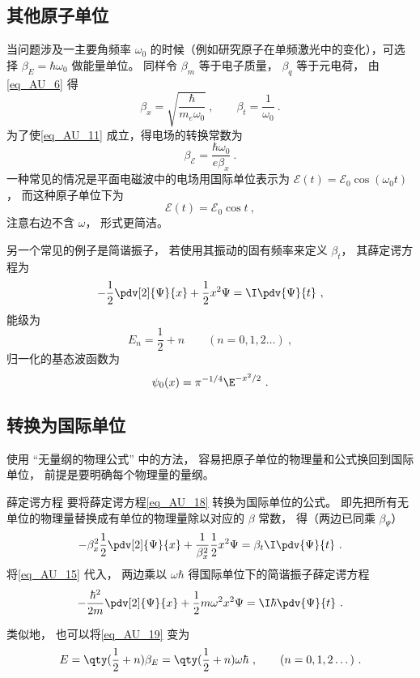 \subsection{其他原子单位}

当问题涉及一主要角频率 $\omega_0$ 的时候（例如研究原子在单频激光中的变化），可选择 $\beta_E = \hbar\omega_0$ 做能量单位。 同样令 $\beta_m$ 等于电子质量， $\beta_q$ 等于元电荷， 由\autoref{eq_AU_6} 得
\begin{equation}\label{eq_AU_15}
\beta_x = \sqrt{\frac{\hbar}{m_e\omega_0}}~,
\qquad
\beta_t = \frac{1}{\omega_0}~.
\end{equation}
为了使\autoref{eq_AU_11} 成立，得电场的转换常数为
\begin{equation}
\beta_\mathcal{E} = \frac{\hbar\omega_0}{e \beta_x}~.
\end{equation}
一种常见的情况是平面电磁波中的电场用国际单位表示为 $\mathcal{E}(t) = \mathcal{E}_0\cos(\omega_0 t)$， 而这种原子单位下为
\begin{equation}
\mathcal{E}(t) = \mathcal{E}_0\cos t~,
\end{equation}
注意右边不含 $\omega$， 形式更简洁。

另一个常见的例子是简谐振子， 若使用其振动的固有频率来定义 $\beta_t$， 其薛定谔方程为
\begin{equation}\label{eq_AU_18}
-\frac12 \pdv[2]{\Psi}{x} + \frac12 x^2 \Psi= \I\pdv{\Psi}{t}~,
\end{equation}
能级为
\begin{equation}\label{eq_AU_19}
E_n = \frac12 + n \qquad (n = 0, 1, 2\dots)~,
\end{equation}
归一化的基态波函数为
\begin{equation}
\psi_0(x) = \pi^{-1/4} \E^{-x^2/2}~.
\end{equation}

\subsection{转换为国际单位}
使用 “无量纲的物理公式” 中的方法， 容易把原子单位的物理量和公式换回到国际单位， 前提是要明确每个物理量的量纲。

\begin{example}{薛定谔方程}
要将薛定谔方程\autoref{eq_AU_18} 转换为国际单位的公式。 即先把所有无单位的物理量替换成有单位的物理量除以对应的 $\beta$ 常数， 得（两边已同乘 $\beta_\Psi$）
\begin{equation}
-\beta_x^2\frac12 \pdv[2]{\Psi}{x} + \frac{1}{\beta_x^2}\frac12 x^2 \Psi= \beta_t\I\pdv{\Psi}{t}~.
\end{equation}
将\autoref{eq_AU_15} 代入， 两边乘以 $\omega\hbar$ 得国际单位下的简谐振子薛定谔方程
\begin{equation}
-\frac{\hbar^2}{2m} \pdv[2]{\Psi}{x} + \frac12 m\omega^2 x^2 \Psi= \I\hbar\pdv{\Psi}{t}~.
\end{equation}

类似地， 也可以将\autoref{eq_AU_19} 变为
\begin{equation}
E =  \qty(\frac12 + n)\beta_E = \qty(\frac12 + n)\omega\hbar ~,\qquad (n = 0, 1, 2\dots)~.
\end{equation}
\end{example}
